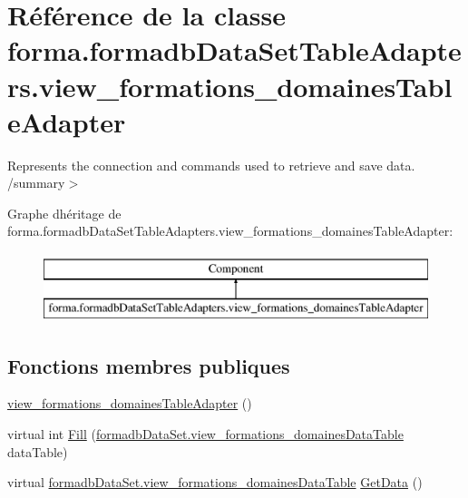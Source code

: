 \hypertarget{classforma_1_1formadb_data_set_table_adapters_1_1view__formations__domaines_table_adapter}{}\section{Référence de la classe forma.\+formadb\+Data\+Set\+Table\+Adapters.\+view\+\_\+formations\+\_\+domaines\+Table\+Adapter}
\label{classforma_1_1formadb_data_set_table_adapters_1_1view__formations__domaines_table_adapter}


Represents the connection and commands used to retrieve and save data. /summary$>$  


Graphe d\textquotesingle{}héritage de forma.\+formadb\+Data\+Set\+Table\+Adapters.\+view\+\_\+formations\+\_\+domaines\+Table\+Adapter\+:\begin{figure}[H]
\begin{center}
\leavevmode
\includegraphics[height=2.000000cm]{classforma_1_1formadb_data_set_table_adapters_1_1view__formations__domaines_table_adapter}
\end{center}
\end{figure}
\subsection*{Fonctions membres publiques}
\begin{DoxyCompactItemize}
\item 
\hyperlink{classforma_1_1formadb_data_set_table_adapters_1_1view__formations__domaines_table_adapter_a1f5e16e039ee66fa0647c39d966e8962}{view\+\_\+formations\+\_\+domaines\+Table\+Adapter} ()
\item 
virtual int \hyperlink{classforma_1_1formadb_data_set_table_adapters_1_1view__formations__domaines_table_adapter_a6f598dd6cac93dd156639efbd74aa72f}{Fill} (\hyperlink{classforma_1_1formadb_data_set_1_1view__formations__domaines_data_table}{formadb\+Data\+Set.\+view\+\_\+formations\+\_\+domaines\+Data\+Table} data\+Table)
\item 
virtual \hyperlink{classforma_1_1formadb_data_set_1_1view__formations__domaines_data_table}{formadb\+Data\+Set.\+view\+\_\+formations\+\_\+domaines\+Data\+Table} \hyperlink{classforma_1_1formadb_data_set_table_adapters_1_1view__formations__domaines_table_adapter_a0fe75b3ab9cfeb927d839f4b3a6403cc}{Get\+Data} ()
\end{DoxyCompactItemize}
